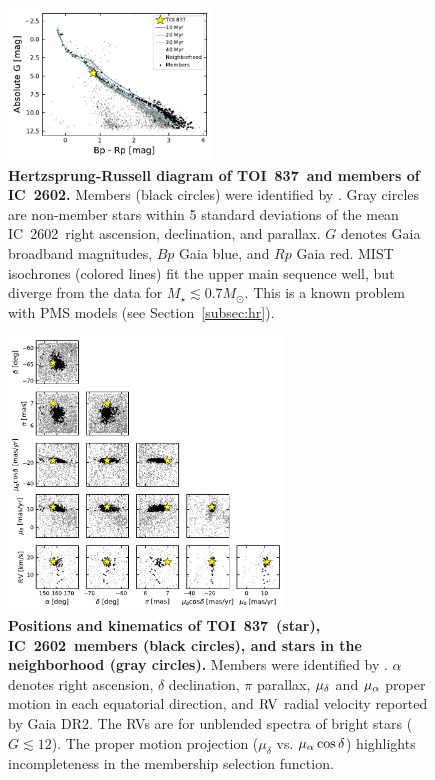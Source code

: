 \documentclass[12pt,twocolumn,tighten]{aastex63}
\newcommand{\tn}{TOI~837} %
\newcommand{\cn}{IC~2602} %
\begin{document}
\begin{figure}[!t]
	\begin{center}
		\leavevmode
		\includegraphics[width=0.48\textwidth]{f7.pdf}
	\end{center}
	\vspace{-0.7cm}
	\caption{ 
  {\bf Hertzsprung-Russell diagram of \tn\ and members of \cn.}
  Members (black circles) were identified by
  \citet{cantatgaudin_gaia_2018}.  Gray circles are non-member stars
  within 5 standard deviations of the mean \cn\ right ascension,
  declination, and parallax.  $G$ denotes Gaia broadband magnitudes,
  $Bp$ Gaia blue, and $Rp$ Gaia red.  MIST isochrones (colored lines)
  fit the upper main sequence well, but diverge from the data for
  $M_\star \lesssim 0.7 M_\odot$. This is a known problem with PMS
  models (see Section~\ref{subsec:hr}).
  \label{fig:hr}
	}
\end{figure}

\begin{figure}[!t]
	\begin{center}
		\leavevmode
		\includegraphics[width=0.65\textwidth]{f8.pdf}
	\end{center}
	\vspace{-0.6cm}
	\caption{ 
  {\bf Positions and kinematics of \tn\ (star), \cn\ members (black
  circles), and stars in the neighborhood (gray circles).} Members
  were identified by \citet{cantatgaudin_gaia_2018}.  $\alpha$ denotes
  right ascension, $\delta$ declination, $\pi$ parallax, $\mu_{\rm
  \delta}$ and $\mu_{\rm \alpha}$ proper motion in each equatorial
  direction, and ${\rm RV}$ radial velocity reported by Gaia DR2.  The
  RVs are for unblended spectra of bright stars ($G\lesssim 12$).  The
  proper motion projection ($\mu_{\delta}$ vs{.} $\mu_{\rm
  \alpha}\cos\delta$) highlights incompleteness in the membership
  selection function.
  \label{fig:full_kinematics}
	}
\end{figure}
\end{document}
